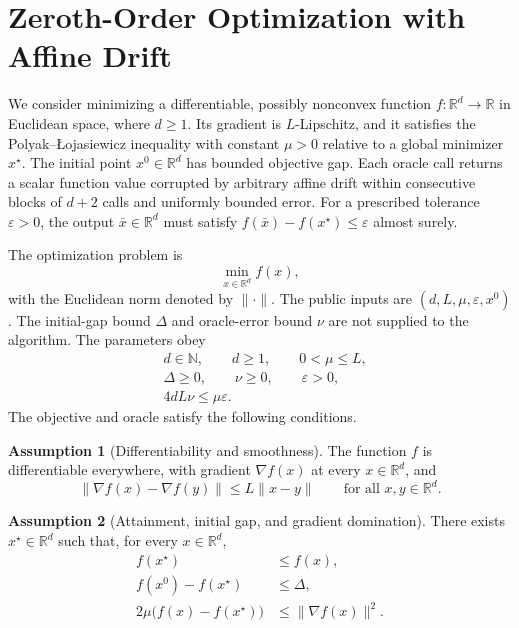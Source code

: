 \documentclass[10pt]{article}
\theoremstyle{definition}
\newtheorem{assumption}{Assumption}
\begin{document}
\section*{Zeroth-Order Optimization with Affine Drift}
We consider minimizing a differentiable, possibly nonconvex function $f:\mathbb{R}^d\to\mathbb{R}$ in Euclidean space, where $d\geq1$. Its gradient is $L$-Lipschitz, and it satisfies the Polyak--{\L}ojasiewicz inequality with constant $\mu>0$ relative to a global minimizer $x^\star$. The initial point $x^0\in\mathbb{R}^d$ has bounded objective gap. Each oracle call returns a scalar function value corrupted by arbitrary affine drift within consecutive blocks of $d+2$ calls and uniformly bounded error. For a prescribed tolerance $\varepsilon>0$, the output $\bar{x}\in\mathbb{R}^d$ must satisfy $f(\bar{x})-f(x^\star)\leq\varepsilon$ almost surely.

The optimization problem is
\[
\min_{x\in\mathbb{R}^d} f(x),
\]
with the Euclidean norm denoted by $\|\cdot\|$. The public inputs are $(d,L,\mu,\varepsilon,x^0)$. The initial-gap bound $\Delta$ and oracle-error bound $\nu$ are not supplied to the algorithm. The parameters obey
\[
\begin{aligned}
&d\in\mathbb{N},\qquad d\geq1,\qquad 0<\mu\leq L,\\
&\Delta\geq0,\qquad \nu\geq0,\qquad \varepsilon>0,\\
&4dL\nu\leq\mu\varepsilon.
\end{aligned}
\]
The objective and oracle satisfy the following conditions.

\begin{assumption}[Differentiability and smoothness]
The function $f$ is differentiable everywhere, with gradient $\nabla f(x)$ at every $x\in\mathbb{R}^d$, and
\[
\|\nabla f(x)-\nabla f(y)\|\leq L\|x-y\|
\qquad\text{for all }x,y\in\mathbb{R}^d.
\]
\end{assumption}

\begin{assumption}[Attainment, initial gap, and gradient domination]
There exists $x^\star\in\mathbb{R}^d$ such that, for every $x\in\mathbb{R}^d$,
\[
\begin{aligned}
f(x^\star)&\leq f(x),\\
f(x^0)-f(x^\star)&\leq\Delta,\\
2\mu\bigl(f(x)-f(x^\star)\bigr)&\leq\|\nabla f(x)\|^2.
\end{aligned}
\]
\end{assumption}
\end{document}
